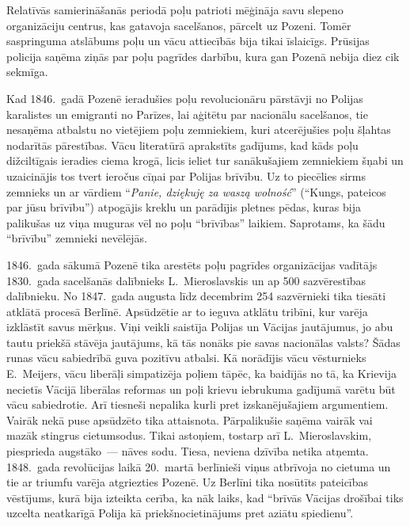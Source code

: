 \documentclass[twoside,a5paper,12pt,fleqn,openany]{extbook}
\newcommand{\pltxti}[1]{\textit{\textpolish{#1}}}
\begin{document}
Relatīvās samierināšanās periodā poļu patrioti mēģināja savu slepeno organizāciju centrus, kas gatavoja sacelšanos, pārcelt uz Pozeni. Tomēr saspringuma atslābums poļu un vācu attiecībās bija tikai īslaicīgs. Prūsijas policija saņēma ziņās par poļu pagrīdes darbību, kura gan Pozenā nebija diez cik sekmīga.

Kad 1846.~gadā Pozenē ieradušies poļu revolucionāru pārstāvji no Polijas karalistes un emigranti no Parīzes, lai aģitētu par nacionālu sacelšanos, tie nesaņēma atbalstu no vietējiem poļu zemniekiem, kuri atcerējušies poļu šļahtas nodarītās pārestības. Vācu literatūrā aprakstīts gadījums, kad kāds poļu dižciltīgais ieradies ciema krogā, licis ieliet tur sanākušajiem zemniekiem šņabi un uzaicinājis tos tvert ieročus cīņai par Polijas brīvību. Uz to piecēlies sirms zemnieks un ar vārdiem ``\pltxti{Panie, dziękuję za waszą wolność}'' (``Kungs, pateicos par jūsu brīvību'') atpogājis kreklu un parādījis pletnes pēdas, kuras bija palikušas uz viņa muguras vēl no poļu ``brīvības'' laikiem. Saprotams, ka šādu ``brīvību'' zemnieki nevēlējās.

1846.~gada sākumā Pozenē tika arestēts poļu pagrīdes organizācijas vadītājs 1830.~gada sacelšanās dalībnieks L.~Mieroslavskis un ap 500 sazvērestības dalībnieku. No 1847.~gada augusta līdz decembrim 254 sazvērnieki tika tiesāti atklātā procesā Berlīnē. Apsūdzētie ar to ieguva atklātu tribīni, kur varēja izklāstīt savus mērķus. Viņi veikli saistīja Polijas un Vācijas jautājumus, jo abu tautu priekšā stāvēja jautājums, kā tās nonāks pie savas nacionālas valsts? Šādas runas vācu sabiedrībā guva pozitīvu atbalsi. Kā norādījis vācu vēsturnieks E.~Meijers, vācu liberāļi simpatizēja poļiem tāpēc, ka baidījās no tā, ka Krievija necietīs Vācijā liberālas reformas un poļi krievu iebrukuma gadījumā varētu būt vācu sabiedrotie. Arī tiesneši nepalika kurli pret izskanējušajiem argumentiem. Vairāk nekā puse apsūdzēto tika attaisnota. Pārpalikušie saņēma vairāk vai mazāk stingrus cietumsodus. Tikai astoņiem, tostarp arī L.~Mieroslavskim, piesprieda augstāko~--- nāves sodu. Tiesa, neviena dzīvība netika atņemta. 1848.~gada revolūcijas laikā 20.~martā berlīnieši viņus atbrīvoja no cietuma un tie ar triumfu varēja atgriezties Pozenē. Uz Berlīni tika nosūtīts pateicības vēstījums, kurā bija izteikta cerība, ka nāk laiks, kad ``brīvās Vācijas drošībai tiks uzcelta neatkarīgā Polija kā priekšnocietinājums pret aziātu spiedienu''.
\end{document}
